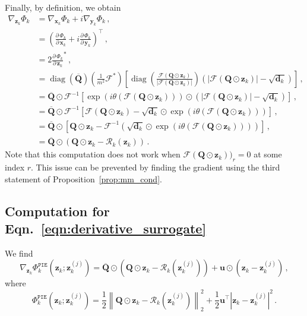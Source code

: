 \documentclass{article}
\numberwithin{equation}{section}
\begin{document}
Finally, by definition, we obtain
\begin{equation*}
\begin{aligned}
    \nabla_{\bm{z}_k} \Phi_k &= \nabla_{\bm{x}_k} \Phi_k + i\nabla_{\bm{y}_k} \Phi_k\,,\\
    &= \left(\frac{\partial\,  \Phi_{k}}{\partial\,  \bm{x}_k} + i\frac{\partial\,  \Phi_{k}}{\partial\,  \bm{y}_k}\right)^\top\,,\\
     &= 2\frac{\partial\,  \Phi_{k}}{\partial\,  \bm{z}_k}^*\,,\\
    &= \operatorname{diag}\left(\overline{\bm{Q}}\right)\left(\frac{1}{m^2}\mathcal{F}^*\right)\left[\operatorname{diag}\left(\frac{\mathcal{F}(\bm{Q}\odot\bm{z}_k)}{|\mathcal{F}(\bm{Q}\odot\bm{z}_k)|}\right) \left(|\mathcal{F}(\bm{Q}\odot\bm{z}_k)|-\sqrt{\bm{d}_k}\right)\right]\,,\\
    &= \overline{\bm{Q}}\odot\mathcal{F}^{-1}\left[\exp\left(i \theta(\mathcal{F}(\bm{Q}\odot \bm{z}_k))\right)\odot\left(|\mathcal{F}(\bm{Q}\odot\bm{z}_k)|-\sqrt{\bm{d}_k}\right)\right]\,,\\
    &= \overline{\bm{Q}}\odot\mathcal{F}^{-1}\left[\mathcal{F}(\bm{Q}\odot\bm{z}_k)-\sqrt{\bm{d}_k}\odot\exp\left(i \theta(\mathcal{F}(\bm{Q}\odot \bm{z}_k))\right)\right]\,,\\
    &= \overline{\bm{Q}}\odot\left[\bm{Q}\odot\bm{z}_k-\mathcal{F}^{-1}\left(\sqrt{\bm{d}_k}\odot\exp\left(i \theta(\mathcal{F}(\bm{Q}\odot \bm{z}_k))\right)\right)\right]\,,\\
    &= \overline{\bm{Q}}\odot\left(\bm{Q}\odot\bm{z}_k-\mathcal{R}_k(\bm{z}_k)\right)\,.
\end{aligned}
\end{equation*}
Note that this computation does not work when $\mathcal{F}(\bm{Q}\odot \bm{z}_k))_r=0$ at some index $r$.  This issue can be prevented by finding the gradient using the third statement of Proposition~\ref{prop:mm_cond}. 

\subsection[Computation for the Surrogate Derivative]{Computation for Eqn.~\ref{eqn:derivative_surrogate}}\label{app:computation_surrogate_derivative}
We find 
\begin{equation*} 
    \nabla_{\bm{z}_k}\Phi^{\texttt{PIE}}_k\left(\bm{z}_k ; \bm{z}_k^{(j)}\right) = \overline{\bm{Q}}\odot\left(\bm{Q}\odot\bm{z}_k - \mathcal{R}_k\left(\bm{z}_k^{(j)}\right)\right) + \bm{u}\odot\left(\bm{z}_k - \bm{z}_k^{(j)}\right)\,,
\end{equation*}
where 
\begin{equation*}
    \Phi^{\texttt{PIE}}_k\left(\bm{z}_k ; \bm{z}_k^{(j)}\right) = \frac{1}{2} \left\|\bm{Q}\odot \bm{z}_k - \mathcal{R}_k\left(\bm{z}_k^{(j)}\right)\right\|_2^2 + \frac{1}{2}\bm{u}^\top\left|\bm{z}_k - \bm{z}_k^{(j)}\right|^2\,.
\end{equation*}
\end{document}
